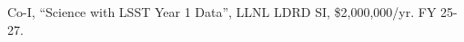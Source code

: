 \begin{innerlist}

  \item Co-I,
  ``Science with LSST Year 1 Data'',
  LLNL LDRD SI,
  \$2,000,000/yr.
  FY 25-27.

\end{innerlist}